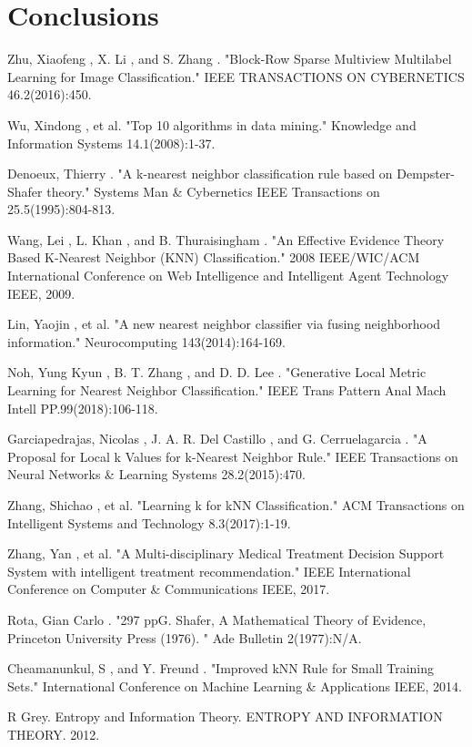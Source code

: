 \documentclass[runningheads]{llncs}
\begin{document}
\section{Conclusions}


\begin{thebibliography}{8}
Zhu, Xiaofeng , X. Li , and S. Zhang . "Block-Row Sparse Multiview Multilabel Learning for Image Classification." IEEE TRANSACTIONS ON CYBERNETICS 46.2(2016):450.

Wu, Xindong , et al. "Top 10 algorithms in data mining." Knowledge and Information Systems 14.1(2008):1-37.

Denoeux, Thierry . "A k-nearest neighbor classification rule based on Dempster-Shafer theory." Systems Man \& Cybernetics IEEE Transactions on 25.5(1995):804-813.

Wang, Lei , L. Khan , and B. Thuraisingham . "An Effective Evidence Theory Based K-Nearest Neighbor (KNN) Classification." 2008 IEEE/WIC/ACM International Conference on Web Intelligence and Intelligent Agent Technology IEEE, 2009.

Lin, Yaojin , et al. "A new nearest neighbor classifier via fusing neighborhood information." Neurocomputing 143(2014):164-169.

Noh, Yung Kyun , B. T. Zhang , and D. D. Lee . "Generative Local Metric Learning for Nearest Neighbor Classification." IEEE Trans Pattern Anal Mach Intell PP.99(2018):106-118.

Garciapedrajas, Nicolas , J. A. R. Del Castillo , and G. Cerruelagarcia . "A Proposal for Local k Values for k-Nearest Neighbor Rule." IEEE Transactions on Neural Networks \& Learning Systems 28.2(2015):470.

Zhang, Shichao , et al. "Learning k for kNN Classification." ACM Transactions on Intelligent Systems and Technology 8.3(2017):1-19. 

Zhang, Yan , et al. "A Multi-disciplinary Medical Treatment Decision Support System with intelligent treatment recommendation." IEEE International Conference on Computer \& Communications IEEE, 2017.

Rota, Gian Carlo . "297 ppG. Shafer, A Mathematical Theory of Evidence, Princeton University Press (1976). " Ade Bulletin 2(1977):N/A.

Cheamanunkul, S , and Y. Freund . "Improved kNN Rule for Small Training Sets." International Conference on Machine Learning \& Applications IEEE, 2014.

R Grey. Entropy and Information Theory. ENTROPY AND INFORMATION THEORY. 2012.


\end{thebibliography}
\end{document}
